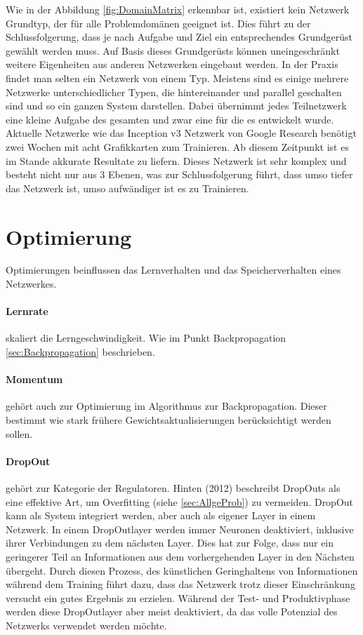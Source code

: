 Wie in der Abbildung \ref{fig:DomainMatrix} erkennbar ist, existiert kein Netzwerk Grundtyp, der für alle Problemdomänen geeignet ist.
Dies führt zu der Schlussfolgerung, dass je nach Aufgabe und Ziel ein entsprechendes Grundgerüst gewählt werden muss. 
Auf Basis dieses Grundgerüsts können uneingeschränkt weitere Eigenheiten aus anderen Netzwerken eingebaut werden.
In der Praxis findet man selten ein Netzwerk von einem Typ.
Meistens sind es einige mehrere Netzwerke unterschiedlicher Typen, die hintereinander und parallel geschalten sind und so ein ganzen System darstellen.
Dabei übernimmt jedes Teilnetzwerk eine kleine Aufgabe des gesamten und zwar eine für die es entwickelt wurde.
Aktuelle Netzwerke wie das Inception v3 Netzwerk von Google Research benötigt zwei Wochen mit acht Grafikkarten zum Trainieren. 
Ab diesem Zeitpunkt ist es im Stande akkurate Resultate zu liefern. 
Dieses Netzwerk ist sehr komplex und besteht nicht nur aus 3 Ebenen, was zur Schlussfolgerung führt, dass umso tiefer das Netzwerk ist, umso aufwändiger ist es zu Trainieren.

\section{Optimierung}

Optimierungen beinflussen das Lernverhalten und das Speicherverhalten eines Netzwerkes.

\paragraph{Lernrate} skaliert die Lerngeschwindigkeit. 
Wie im Punkt Backpropagation \ref{sec:Backpropagation} beschrieben.

\paragraph{Momentum} gehört auch zur Optimierung im Algorithmus zur Backpropagation.
Dieser bestimmt wie stark frühere Gewichtsaktualisierungen berücksichtigt werden sollen. 

\paragraph{DropOut} gehört zur Kategorie der Regulatoren. 
Hinten (2012) beschreibt DropOuts als eine effektive Art, um Overfitting (siehe \ref{sec:AllgeProb}) zu vermeiden.
DropOut kann als System integriert werden, aber auch als eigener Layer in einem Netzwerk.
In einem DropOutlayer werden immer Neuronen deaktiviert, inklusive ihrer Verbindungen zu dem nächsten Layer.
Dies hat zur Folge, dass nur ein geringerer Teil an Informationen aus dem vorhergehenden Layer in den Nächsten übergeht. 
Durch diesen Prozess, des künstlichen Geringhaltens von Informationen während dem Training führt dazu, dass das Netzwerk trotz dieser Einschränkung versucht ein gutes Ergebnis zu erzielen. 
Während der Test- und Produktivphase werden diese DropOutlayer aber meist deaktiviert, da das volle Potenzial des Netzwerks verwendet werden möchte.


